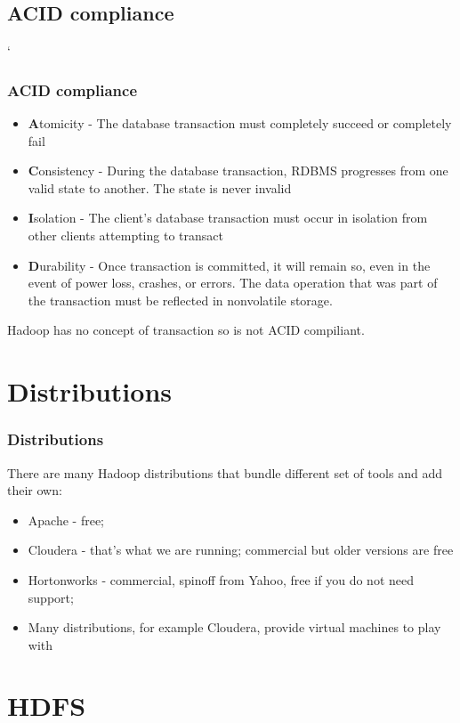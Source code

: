 \documentclass{beamer}
\begin{document}
\subsection{ACID compliance}
\begin{frame}
`\frametitle{ACID compliance}
\begin{itemize}
  \item {\color{mycolordef}\textbf{A}}tomicity - The database transaction must completely succeed or completely fail
  \item {\color{mycolordef}\textbf{C}}onsistency - During the database transaction, RDBMS progresses from one valid state to another. The state is never invalid
  \item {\color{mycolordef}\textbf{I}}solation - The client's database transaction must occur in isolation from other clients attempting to transact
  \item {\color{mycolordef}\textbf{D}}urability - Once transaction is committed, it will remain so, 
    even in the event of power loss, crashes, or errors. The data operation that was part of the transaction must be reflected in nonvolatile storage. 
\end{itemize}

Hadoop has no concept of transaction so is not ACID compiliant.

\end{frame}

\section{Distributions}
\begin{frame}
 \frametitle{Distributions}
 There are many Hadoop distributions that bundle different set of tools and add their own:
 \begin{itemize}
  \item {\color{mycolordef}Apache}  - free;
  \item {\color{mycolordef}Cloudera} - that's what we are running; commercial but older versions are free
  \item {\color{mycolordef}Hortonworks}  - commercial, spinoff from Yahoo, free if you do not need support;
  \item Many distributions, for example Cloudera, provide virtual machines to play with
 \end{itemize}
\end{frame}

\section{HDFS}
\end{document}
